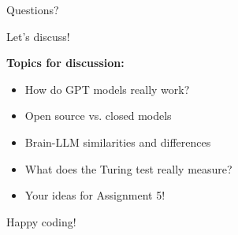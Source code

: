 \documentclass[aspectratio=169]{beamer}
\begin{document}
\begin{frame}{Questions? 🤔}
\begin{center}
\Large{Let's discuss!}

\vspace{2cm}

\textbf{Topics for discussion:}

\vspace{0.5cm}

\begin{itemize}
    \item How do GPT models really work?
    \item Open source vs. closed models
    \item Brain-LLM similarities and differences
    \item What does the Turing test really measure?
    \item Your ideas for Assignment 5!
\end{itemize}

\vspace{2cm}

\large{Happy coding! 🚀}
\end{center}
\end{frame}
\end{document}
